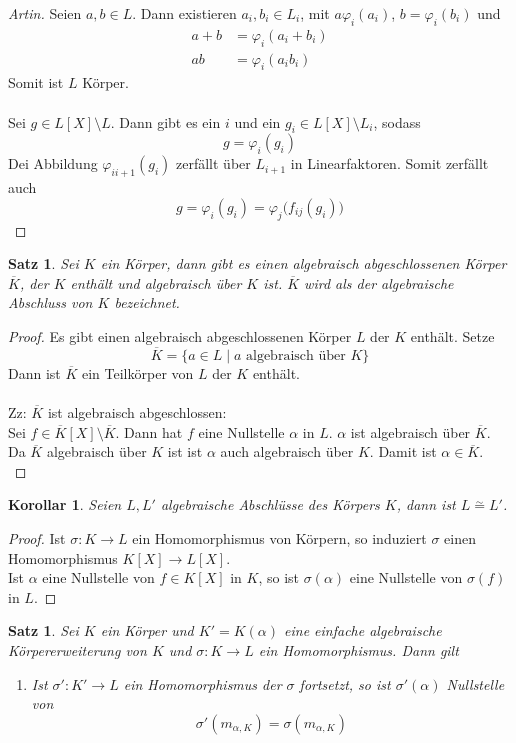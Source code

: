 \documentclass[10pt,a4paper]{article}
\newcommand{\al}{\ensuremath{\alpha}}
\newcommand{\isom}{\overset{\sim}{=}}
\theoremstyle{plain}
\newtheorem{kor}[theorem]{Korollar}
\newtheorem{satz}[theorem]{Satz}
\theoremstyle{definition}
\theoremstyle{remark}
\begin{document}
\begin{proof}[Artin]
		Seien $a,b\in L$. Dann existieren $a_i,b_i\in L_i$, mit $a\varphi_i(a_i)$, $b=\varphi_i(b_i)$ und
		\begin{align*}
		a+b&=\varphi_i(a_i+b_i)\\
		ab&=\varphi_i(a_ib_i)
		\end{align*}
		Somit ist $L$ Körper.\\
		\\
		Sei $g\in L[X]\setminus L$. Dann gibt es ein $i$ und ein $g_i\in L[X]\setminus L_i$, sodass
		\[g=\varphi_i(g_i)\]
		Dei Abbildung $\varphi_{ii+1}(g_i)$ zerfällt über $L_{i+1}$ in Linearfaktoren. Somit zerfällt auch
		\[g=\varphi_i(g_i)=\varphi_{j}\big(f_{ij}(g_i)\big)\]
 	\end{proof}
 
 	\begin{satz}
 		Sei $K$ ein Körper, dann gibt es einen algebraisch abgeschlossenen Körper $\overline{K}$, der $K$ enthält und algebraisch über $K$ ist. $\overline{K}$ wird als der algebraische Abschluss von $K$ bezeichnet.
 	\end{satz}
 	\begin{proof}
 		Es gibt einen algebraisch abgeschlossenen Körper $L$ der $K$ enthält. Setze\[\overline{K}=\{a\in L\mid \text{$a$ algebraisch über $K$}\}\]
 		Dann ist $\overline{K}$ ein Teilkörper von $L$ der $K$ enthält.\\
 		\\
 		Zz: $\overline{K}$ ist algebraisch abgeschlossen:\\
 		Sei $f\in\overline{K}[X]\setminus\overline{K}$. Dann hat $f$ eine Nullstelle $\al$ in $L$. $\al$ ist algebraisch über $\overline{K}$. Da $\overline{K}$ algebraisch über $K$ ist ist $\al$ auch algebraisch über $K$. Damit ist $\al\in\overline{K}$.\\
 	\end{proof}
 
 	\begin{kor}
 		Seien $L,L'$ algebraische Abschlüsse des Körpers $K$, dann ist $L\isom L'$.
 	\end{kor}
 	\begin{proof}
 		Ist $\sigma:K\to L$ ein Homomorphismus von Körpern, so induziert $\sigma$ einen Homomorphismus $K[X]\to L[X]$.\\
 		Ist $\al$ eine Nullstelle von $f\in K[X]$ in $K$, so ist $\sigma(\al)$ eine Nullstelle von $\sigma(f)$ in $L$.
 	\end{proof}
 
 	\begin{satz}
 		Sei $K$ ein Körper und $K'=K(\al)$ eine einfache algebraische Körpererweiterung von $K$ und $\sigma:K\to L$ ein Homomorphismus. Dann gilt
 		\begin{enumerate}
 			\item Ist $\sigma':K'\to L$ ein Homomorphismus der $\sigma$ fortsetzt, so ist $\sigma'(\al)$ Nullstelle von
 			\[\sigma'(m_{\al,K})=\sigma(m_{\al,K})\]
 		\end{enumerate}
 	\end{satz}
 
\end{document}
